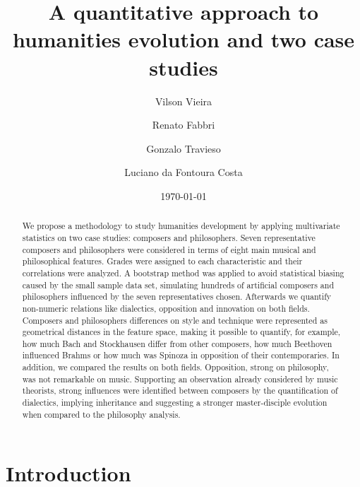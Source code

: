 \documentclass[
 aip,
 jmp,
 amsmath,amssymb,
 reprint,
]{revtex4-1}
\begin{document}
\title[A quantitative approach to humanities evolution and two case studies]{A quantitative approach to humanities evolution and two case studies}
\author{Vilson Vieira}
\author{Renato Fabbri}
\author{Gonzalo Travieso}
\author{Luciano da Fontoura Costa}
\date{\today}
\begin{abstract}
We propose a
methodology
to study humanities development by
applying multivariate statistics on two case studies: composers and philosophers.
Seven representative composers and philosophers were considered in terms of
eight main musical and philosophical features. 
Grades
were assigned to each characteristic and their correlations were
analyzed. 
A bootstrap method was
applied to avoid statistical biasing caused by the small sample data set, simulating hundreds of artificial composers and philosophers
influenced by the seven representatives chosen.
Afterwards we quantify non-numeric relations like dialectics, opposition
and innovation on both fields.
Composers and philosophers differences on style and technique were represented
as geometrical distances in the feature space, making it possible to
quantify, for example, how much Bach and Stockhausen differ from other composers, how
much Beethoven influenced Brahms or how much was Spinoza in opposition of their contemporaries.
In addition, we compared the results on both fields. Opposition, strong on
philosophy, was not remarkable on music. Supporting an observation already considered by music
theorists, strong influences were identified between
composers by the quantification of dialectics, implying inheritance and suggesting a stronger
master-disciple evolution when compared to the philosophy analysis.
\end{abstract}
\maketitle

\section{\label{sec:level1}Introduction}
\end{document}
